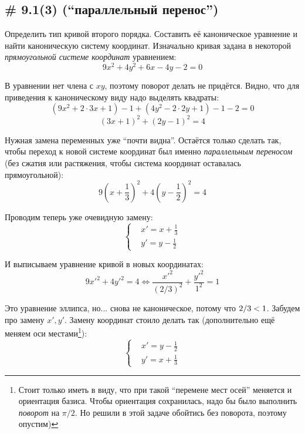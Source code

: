\documentclass[a4paper,12pt]{article}
\begin{document}
  
  \subsection{\# 9.1(3) (``параллельный перенос'')}
  
  Определить тип кривой второго порядка.
  Составить её каноническое уравнение и найти каноническую систему координат.
  Изначально кривая задана в некоторой \emph{прямоугольной системе координат} уравнением:
  \begin{equation}\label{eq:problem-9-1}
    9x^2 + 4y^2 + 6x - 4y - 2 = 0
  \end{equation}
  
  \begin{solution}
    В уравнении нет члена с $xy$, поэтому поворот делать не придётся.
    Видно, что для приведения к каноническому виду надо выделять квадраты:
    \[
      (9x^2 + 2 \cdot 3x + 1) - 1 + (4y^2 - 2 \cdot 2y + 1) - 1 - 2 = 0
    \]
    \[
      (3x + 1)^2 + (2y - 1)^2 = 4
    \]
    
    Нужная замена переменных уже ``почти видна''.
    Остаётся только сделать так, чтобы переход к новой системе координат был именно \emph{параллельным переносом} (без сжатия или растяжения, чтобы система координат оставалась прямоугольной):
    \[
      9 \left(x + \frac{1}{3}\right)^2 + 4 \left(y - \frac{1}{2}\right)^2 = 4
    \]
    
    Проводим теперь уже очевидную замену:
    \[
      \left\{
        \begin{aligned}
          &x' = x + \frac{1}{3}\\
          &y' = y - \frac{1}{2}
        \end{aligned}
      \right.
    \]
    
    И выписываем уравнение кривой в новых координатах:
    \[
      9 x'^2 + 4 y'^2 = 4 \Leftrightarrow \frac{x'^2}{(2/3)^2} + \frac{y'^2}{1^2} = 1
    \]
    
    Это уравнение эллипса, но... снова не каноническое, потому что $2/3 \hm< 1$.
    Забудем про замену $x', y'$.
    Замену координат стоило делать так (дополнительно ещё меняем оси местами\footnote{Стоит только иметь в виду, что при такой ``перемене мест осей'' меняется и ориентация базиса. Чтобы ориентация сохранилась, надо бы было выполнить \emph{поворот} на $\pi/2$. Но решили в этой задаче обойтись без поворота, поэтому опустим)}):
    \[
      \left\{
        \begin{aligned}
          &x' = y - \frac{1}{2}\\
          &y' = x + \frac{1}{3}
        \end{aligned}
      \right.
    \]
    

\end{solution}
\end{document}
